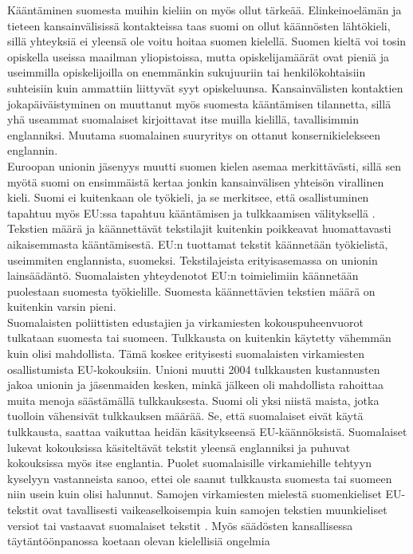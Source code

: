 \begin{multicols}{2}
Kääntäminen suomesta muihin kieliin on myös ollut
tärkeää. Elinkeinoelämän ja tieteen kansainvälisissä kontakteissa taas
suomi on ollut käännösten lähtökieli, sillä yhteyksiä ei yleensä ole
voitu hoitaa suomen kielellä. Suomen kieltä voi tosin opiskella
useissa maailman yliopistoissa, mutta opiskelijamäärät ovat pieniä ja
useimmilla opiskelijoilla on enemmänkin sukujuuriin tai
henkilökohtaisiin suhteisiin kuin ammattiin liittyvät syyt
opiskeluunsa. Kansainvälisten kontaktien jokapäiväistyminen on
muuttanut myös suomesta kääntämisen tilannetta, sillä yhä useammat
suomalaiset kirjoittavat itse muilla kielillä, tavallisimmin
englanniksi. Muutama suomalainen suuryritys on ottanut
konsernikielekseen englannin.\\
Euroopan unionin jäsenyys muutti suomen kielen asemaa merkittävästi,
sillä sen myötä suomi on ensimmäistä kertaa jonkin kansainvälisen
yhteisön virallinen kieli. Suomi ei kuitenkaan ole työkieli, ja se
merkitsee, että osallistuminen tapahtuu myös EU:ssa tapahtuu
kääntämisen ja tulkkaamisen välityksellä \cite{Tulevaisuus2009}.
Tekstien määrä ja käännettävät tekstilajit kuitenkin poikkeavat
huomattavasti aikaisemmasta kääntämisestä. EU:n tuottamat tekstit
käännetään työkielistä, useimmiten englannista, suomeksi.
Tekstilajeista erityisasemassa on unionin lainsäädäntö. Suomalaisten
yhteydenotot EU:n toimielimiin käännetään puolestaan suomesta
työkielille. Suomesta käännettävien tekstien määrä on kuitenkin varsin
pieni.\\
Suomalaisten poliittisten edustajien ja virkamiesten
kokouspuheenvuorot tulkataan suomesta tai suomeen. Tulkkausta on
kuitenkin käytetty vähemmän kuin olisi mahdollista. Tämä koskee
erityisesti suomalaisten virkamiesten osallistumista
EU-kokouksiin. Unioni muutti 2004 tulkkausten kustannusten jakoa
unionin ja jäsenmaiden kesken, minkä jälkeen oli mahdollista rahoittaa
muita menoja säästämällä tulkkauksesta. Suomi oli yksi niistä maista,
jotka tuolloin vähensivät tulkkauksen määrää.
Se, että suomalaiset eivät käytä tulkkausta, saattaa vaikuttaa heidän
käsitykseensä EU-käännöksistä. Suomalaiset lukevat kokouksissa
käsiteltävät tekstit yleensä englanniksi ja puhuvat kokouksissa myös
itse englantia. Puolet suomalaisille virkamiehille tehtyyn kyselyyn
vastanneista sanoo, ettei ole saanut tulkkausta suomesta tai suomeen
niin usein kuin olisi halunnut. Samojen virkamiesten mielestä
suomenkieliset EU-tekstit ovat tavallisesti vaikeaselkoisempia kuin
samojen tekstien muunkieliset versiot tai vastaavat suomalaiset
tekstit \cite{Piehl2008}. Myös säädösten kansallisessa
täytäntöönpanossa koetaan olevan kielellisiä ongelmia

\end{multicols}
